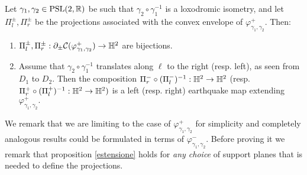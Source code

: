  \begin{proposition}\label{estensione}
     Let $\gamma_1,\gamma_2 \in \text{PSL}(2,\mathbb{R})$ be such that $\gamma_2\circ\gamma_1^{-1}$ is a loxodromic isometry, and let $\Pi_l^\pm, \Pi_r^\pm$ be the projections associated with the convex envelope of $\varphi_{\gamma_1,\gamma_2}^+.$ Then:
     \begin{enumerate}
         \item $\Pi_l^\pm, \Pi_r^\pm:\partial_\pm\mathcal{C}(\varphi_{\gamma_1,\gamma_2}^+)\to\mathbb{H}^2$ are bijections.
         \item Assume that $\gamma_2\circ\gamma_1^{-1}$ translates along $\ell$ to the right (resp. left), as seen from $D_1$ to $D_2.$ Then the composition $\Pi_r^-\circ(\Pi_l^-)^{-1}:\mathbb{H}^2\to\mathbb{H}^2$ (resp. $\Pi_r^+\circ(\Pi_l^+)^{-1}:\mathbb{H}^2\to\mathbb{H}^2)$ is a left (resp. right) earthquake map extending $\varphi_{\gamma_1,\gamma_2}^+.$
     \end{enumerate} 
 \end{proposition}

 We remark that we are limiting to the case of $\varphi_{\gamma_1,\gamma_2}^+$ for simplicity and completely analogous results could be formulated in terms of $\varphi_{\gamma_1,\gamma_2}^-.$ Before proving it we remark that proposition \ref{estensione} holds for \textit{any choice}  of support planes that is needed to define the projections.

